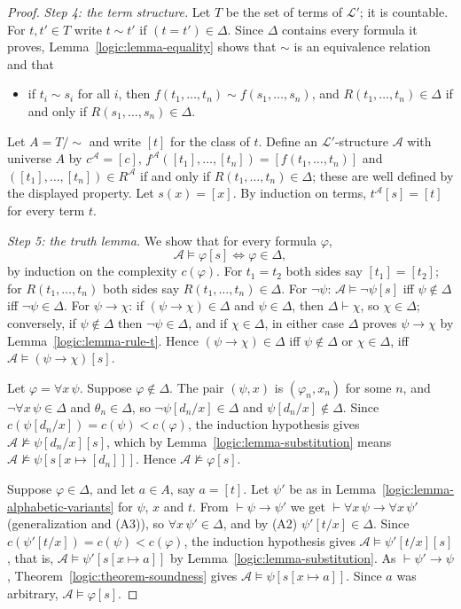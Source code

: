 \begin{proof}
\emph{Step 4: the term structure.} Let $T$ be the set of terms of
$\mathcal{L}'$; it is countable. For $t, t' \in T$ write $t \sim t'$ if
$(t = t') \in \Delta$. Since $\Delta$ contains every formula it proves,
Lemma~\ref{logic:lemma-equality} shows that $\sim$ is an equivalence relation
and that
\begin{itemize}
\item if $t_i \sim s_i$ for all $i$, then
$f(t_1, \ldots, t_n) \sim f(s_1, \ldots, s_n)$, and
$R(t_1, \ldots, t_n) \in \Delta$ if and only if $R(s_1, \ldots, s_n) \in \Delta$.
\end{itemize}
Let $A = T/{\sim}$ and write $[t]$ for the class of $t$. Define an
$\mathcal{L}'$-structure $\mathcal{A}$ with universe $A$ by
$c^{\mathcal{A}} = [c]$,
$f^{\mathcal{A}}([t_1], \ldots, [t_n]) = [f(t_1, \ldots, t_n)]$ and
$([t_1], \ldots, [t_n]) \in R^{\mathcal{A}}$ if and only if
$R(t_1, \ldots, t_n) \in \Delta$; these are well defined by the displayed
property. Let $s(x) = [x]$. By induction on terms, $t^{\mathcal{A}}[s] = [t]$
for every term $t$.

\emph{Step 5: the truth lemma.} We show that for every formula $\varphi$,
\[
\mathcal{A} \models \varphi[s] \iff \varphi \in \Delta,
\]
by induction on the complexity $c(\varphi)$. For $t_1 = t_2$ both sides say
$[t_1] = [t_2]$; for $R(t_1, \ldots, t_n)$ both sides say
$R(t_1, \ldots, t_n) \in \Delta$. For $\neg\psi$: $\mathcal{A} \models \neg\psi[s]$
iff $\psi \notin \Delta$ iff $\neg\psi \in \Delta$. For $\psi \to \chi$: if
$(\psi \to \chi) \in \Delta$ and $\psi \in \Delta$, then $\Delta \vdash \chi$, so
$\chi \in \Delta$; conversely, if $\psi \notin \Delta$ then $\neg\psi \in \Delta$,
and if $\chi \in \Delta$, in either case $\Delta$ proves $\psi \to \chi$ by
Lemma~\ref{logic:lemma-rule-t}. Hence $(\psi \to \chi) \in \Delta$ iff
$\psi \notin \Delta$ or $\chi \in \Delta$, iff
$\mathcal{A} \models (\psi \to \chi)[s]$.

Let $\varphi = \forall x\,\psi$. Suppose $\varphi \notin \Delta$. The pair
$(\psi, x)$ is $(\varphi_n, x_n)$ for some $n$, and
$\neg\forall x\,\psi \in \Delta$ and $\theta_n \in \Delta$, so
$\neg\psi[d_n/x] \in \Delta$ and $\psi[d_n/x] \notin \Delta$. Since
$c(\psi[d_n/x]) = c(\psi) < c(\varphi)$, the induction hypothesis gives
$\mathcal{A} \not\models \psi[d_n/x][s]$, which by
Lemma~\ref{logic:lemma-substitution} means
$\mathcal{A} \not\models \psi[s[x \mapsto [d_n]]]$. Hence
$\mathcal{A} \not\models \varphi[s]$.

Suppose $\varphi \in \Delta$, and let $a \in A$, say $a = [t]$. Let $\psi'$ be
as in Lemma~\ref{logic:lemma-alphabetic-variants} for $\psi$, $x$ and $t$. From
$\vdash \psi \to \psi'$ we get $\vdash \forall x\,\psi \to \forall x\,\psi'$
(generalization and (A3)), so $\forall x\,\psi' \in \Delta$, and by (A2)
$\psi'[t/x] \in \Delta$. Since $c(\psi'[t/x]) = c(\psi) < c(\varphi)$, the
induction hypothesis gives $\mathcal{A} \models \psi'[t/x][s]$, that is,
$\mathcal{A} \models \psi'[s[x \mapsto a]]$ by
Lemma~\ref{logic:lemma-substitution}. As $\vdash \psi' \to \psi$,
Theorem~\ref{logic:theorem-soundness} gives
$\mathcal{A} \models \psi[s[x \mapsto a]]$. Since $a$ was arbitrary,
$\mathcal{A} \models \varphi[s]$.


\end{proof}
